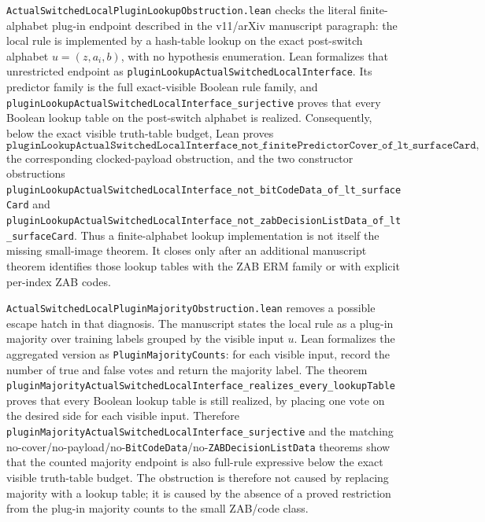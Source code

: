 \documentclass[11pt]{article}
\theoremstyle{remark}
\begin{document}
\texttt{ActualSwitchedLocalPluginLookupObstruction.lean} checks the literal
finite-alphabet plug-in endpoint described in the v11/arXiv manuscript
paragraph: the local rule is implemented by a hash-table lookup on the exact
post-switch alphabet \(u=(z,a_i,b)\), with no hypothesis enumeration.  Lean
formalizes that unrestricted endpoint as
\texttt{pluginLookupActualSwitchedLocalInterface}.  Its predictor family is the
full exact-visible Boolean rule family, and
\texttt{pluginLookupActualSwitchedLocalInterface\_surjective} proves that every
Boolean lookup table on the post-switch alphabet is realized.  Consequently,
below the exact visible truth-table budget, Lean proves
\[
  \texttt{pluginLookupActualSwitchedLocalInterface\_not\_finitePredictorCover\_of\_lt\_surfaceCard},
\]
the corresponding clocked-payload obstruction, and the two constructor
obstructions
\texttt{pluginLookupActualSwitchedLocalInterface\_not\_bitCodeData\_of\_lt\_surfaceCard}
and
\texttt{pluginLookupActualSwitchedLocalInterface\_not\_zabDecisionListData\_of\_lt\_surfaceCard}.
Thus a finite-alphabet lookup implementation is not itself the missing
small-image theorem.  It closes only after an additional manuscript theorem
identifies those lookup tables with the ZAB ERM family or with explicit
per-index ZAB codes.

\texttt{ActualSwitchedLocalPluginMajorityObstruction.lean} removes a possible
escape hatch in that diagnosis.  The manuscript states the local rule as a
plug-in majority over training labels grouped by the visible input \(u\).  Lean
formalizes the aggregated version as \texttt{PluginMajorityCounts}: for each
visible input, record the number of true and false votes and return the
majority label.  The theorem
\texttt{pluginMajorityActualSwitchedLocalInterface\_realizes\_every\_lookupTable}
proves that every Boolean lookup table is still realized, by placing one vote
on the desired side for each visible input.  Therefore
\texttt{pluginMajorityActualSwitchedLocalInterface\_surjective} and the
matching no-cover/no-payload/no-\texttt{BitCodeData}/no-\texttt{ZABDecisionListData}
theorems show that the counted majority endpoint is also full-rule expressive
below the exact visible truth-table budget.  The obstruction is therefore not
caused by replacing majority with a lookup table; it is caused by the absence
of a proved restriction from the plug-in majority counts to the small ZAB/code
class.
\end{document}
